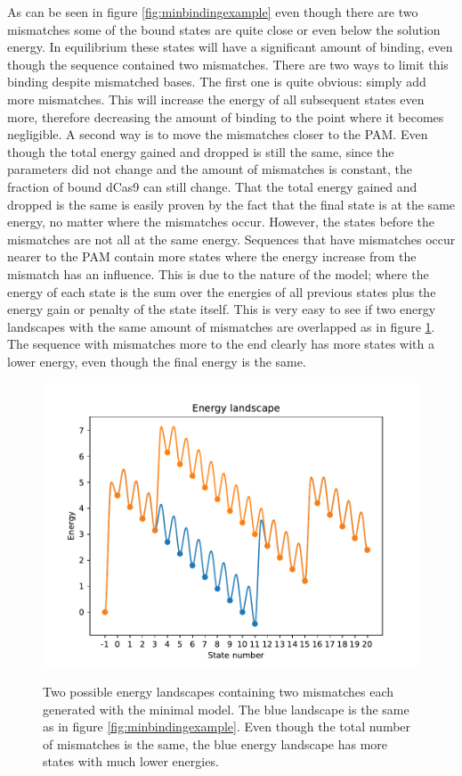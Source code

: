 As can be seen in figure \ref{fig:minbindingexample} even though there are two mismatches some of the bound states are quite close or even below the solution energy. In equilibrium these states will have a significant amount of binding, even though the sequence contained two mismatches. There are two ways to limit this binding despite mismatched bases. The first one is quite obvious: simply add more mismatches. This will increase the energy of all subsequent states even more, therefore decreasing the amount of binding to the point where it becomes negligible. A second way is to move the mismatches closer to the PAM. Even though the total energy gained and dropped is still the same, since the parameters did not change and the amount of mismatches is constant, the fraction of bound dCas9 can still change. That the total energy gained and dropped is the same is easily proven by the fact that the final state is at the same energy, no matter where the mismatches occur. However, the states before the mismatches are not all at the same energy. Sequences that have mismatches occur nearer to the PAM contain more states where the energy increase from the mismatch has an influence. This is due to the nature of the model; where the energy of each state is the sum over the energies of all previous states plus the energy gain or penalty of the state itself. This is very easy to see if two energy landscapes with the same amount of mismatches are overlapped as in figure \ref{fig:minbindingexample2}. The sequence with mismatches more to the end clearly has more states with a lower energy, even though the final energy is the same.

\begin{figure}[H]
\begin{center}
\includegraphics[width=\textwidth]{images/minbindingexample2}
\label{fig:minbindingexample2}
\caption{Two possible energy landscapes containing two mismatches each generated with the minimal model. The blue landscape is the same as in figure \ref{fig:minbindingexample}. Even though the total number of mismatches is the same, the blue energy landscape has more states with much lower energies.}
\end{center}
\end{figure}

